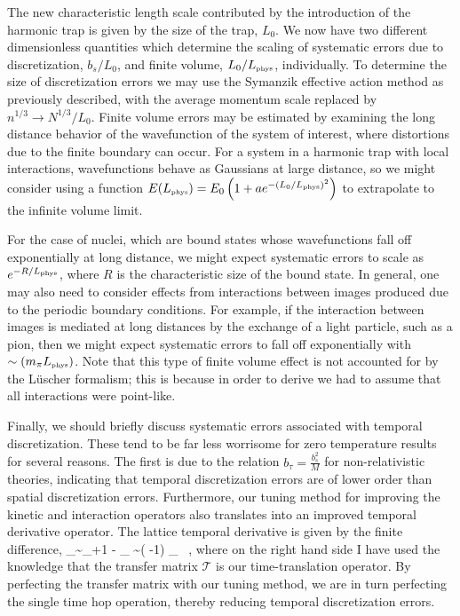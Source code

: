 The new characteristic length scale contributed by the introduction of the harmonic trap is given by the size of the trap, $L_0$. We now have two different dimensionless quantities which determine the scaling of systematic errors due to discretization, $b_s/L_0$, and finite volume, $L_0/L_{\mbox{\tiny phys}}$, individually. To determine the size of discretization errors we may use the Symanzik effective action method as previously described, with the average momentum scale replaced by $n^{1/3} \to N^{1/3}/L_0$. Finite volume errors may be estimated by examining the long distance behavior of the wavefunction of the system of interest, where distortions due to the finite boundary can occur. For a system in a harmonic trap with local interactions, wavefunctions behave as Gaussians at large distance, so we might consider using a function $E(L_{\mbox{\tiny phys}}) = E_0\left(1+a e^{-\left(L_0/L_{\mbox{\tiny phys}}\right)^2}\right)$ to extrapolate to the infinite volume limit. 

For the case of nuclei, which are bound states whose wavefunctions fall off exponentially at long distance, we might expect systematic errors to scale as $e^{-R/L_{\mbox{\tiny phys}}}$, where $R$ is the characteristic size of the bound state. In general, one may also need to consider effects from interactions between images produced due to the periodic boundary conditions. For example, if the interaction between images is mediated at long distances by the exchange of a light particle, such as a pion, then we might expect systematic errors to fall off exponentially with $\sim \left(m_{\pi} L_{\mbox{\tiny phys}}\right)$. Note that this type of finite volume effect is not accounted for by the L\"uscher formalism; this is because in order to derive  we had to assume that all interactions were point-like.

Finally, we should briefly discuss systematic errors associated with temporal discretization. These tend to be far less worrisome for zero temperature results for several reasons. The first is due to the relation $b_{\tau} = \frac{b_s^2}{M}$ for non-relativistic theories, indicating that temporal discretization errors are of lower order than spatial discretization errors. Furthermore, our tuning method for improving the kinetic and interaction operators also translates into an improved temporal derivative operator. The lattice temporal derivative is given by the finite difference,
\beq
\partial_{\tau}\psi \sim \psi_{\tau+1} - \psi_{\tau} \sim \left({} -1\right) \psi_{\tau} \ ,
\eeq
where on the right hand side I have used the knowledge that the transfer matrix ${\mathcal{ T}}$ is our time-translation operator. By perfecting the transfer matrix with our tuning method, we are in turn perfecting the single time hop operation, thereby reducing temporal discretization errors.

